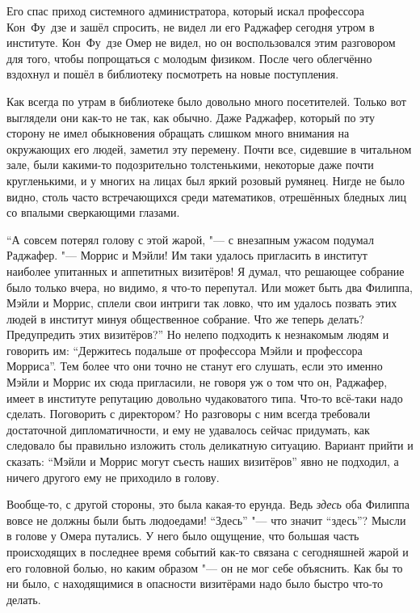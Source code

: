 Его спас приход системного администратора, который искал профессора Кон~Фу~дзе
и зашёл спросить, не видел ли его Раджафер сегодня утром в институте.
Кон~Фу~дзе Омер не видел, но он воспользовался этим разговором для того, чтобы
попрощаться с молодым физиком.
После чего облегчённо вздохнул и пошёл в библиотеку посмотреть на новые
поступления.

Как всегда по утрам в библиотеке было довольно много посетителей.
Только вот выглядели они как-то не так, как обычно.
Даже Раджафер, который по эту сторону не имел обыкновения обращать слишком много
внимания на окружающих его людей, заметил эту перемену.
Почти все, сидевшие в читальном зале, были какими-то подозрительно толстенькими,
некоторые даже почти кругленькими, и у многих на лицах был яркий розовый
румянец.
Нигде не было видно, столь часто встречающихся среди математиков, отрешённых
бледных лиц со впалыми сверкающими глазами.

\enquote{А совсем потерял голову с этой жарой, "--- с внезапным ужасом подумал
Раджафер.
"--- Моррис и Мэйли!
Им таки удалось пригласить в институт наиболее упитанных и аппетитных визитёров!
Я думал, что решающее собрание было только вчера, но видимо, я что-то перепутал.
Или может быть два Филиппа, Мэйли и Моррис, сплели свои интриги так ловко, что им
удалось позвать этих людей в институт минуя общественное собрание.
Что же теперь делать?
Предупредить этих визитёров?}
Но нелепо подходить к незнакомым людям и говорить им: \enquote{Держитесь подальше
от профессора Мэйли и профессора Морриса}.
Тем более что они точно не станут его слушать, если это именно Мэйли и Моррис
их сюда пригласили, не говоря уж о том что он, Раджафер, имеет в институте
репутацию довольно чудаковатого типа.
Что-то всё-таки надо сделать.
Поговорить с директором?
Но разговоры с ним всегда требовали достаточной дипломатичности, и ему не
удавалось сейчас придумать, как следовало бы правильно изложить столь деликатную
ситуацию.
Вариант прийти и сказать: \enquote{Мэйли и Моррис могут съесть наших визитёров}
явно не подходил, а ничего другого ему не приходило в голову.

Вообще-то, с другой стороны, это была какая-то ерунда.
Ведь \emph{здесь} оба Филиппа вовсе не должны были быть людоедами!
\enquote{Здесь} "--- что значит \enquote{здесь}?
Мысли в голове у Омера путались.
У него было ощущение, что большая часть происходящих в последнее время событий
как-то связана с сегодняшней жарой и его головной болью, но каким образом "---
он не мог себе объяснить.
Как бы то ни было, с находящимися в опасности визитёрами надо было быстро что-то
делать.

